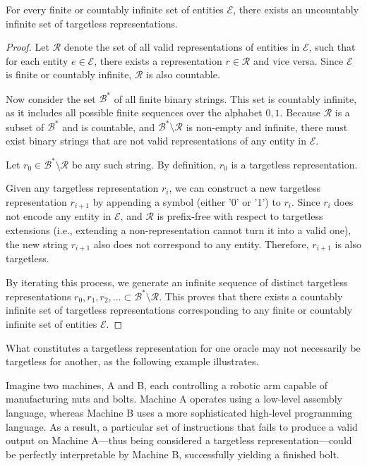 \begin{proposition}
For every finite or countably infinite set of entities $\mathcal{E}$, there exists an uncountably infinite set of targetless representations.
\end{proposition}
\begin{proof}
Let $\mathcal{R}$ denote the set of all valid representations of entities in $\mathcal{E}$, such that for each entity $e \in \mathcal{E}$, there exists a representation $r \in \mathcal{R}$ and vice versa. Since $\mathcal{E}$ is finite or countably infinite, $\mathcal{R}$ is also countable.

Now consider the set $\mathcal{B}^\ast$ of all finite binary strings. This set is countably infinite, as it includes all possible finite sequences over the alphabet ${0,1}$. Because $\mathcal{R}$ is a subset of $\mathcal{B}^\ast$ and is countable, and $\mathcal{B}^\ast \setminus \mathcal{R}$ is non-empty and infinite, there must exist binary strings that are not valid representations of any entity in $\mathcal{E}$.

Let $r_0 \in \mathcal{B}^\ast \setminus \mathcal{R}$ be any such string. By definition, $r_0$ is a targetless representation.

Given any targetless representation $r_i$, we can construct a new targetless representation $r_{i+1}$ by appending a symbol (either '0' or '1') to $r_i$. Since $r_i$ does not encode any entity in $\mathcal{E}$, and $\mathcal{R}$ is prefix-free with respect to targetless extensions (i.e., extending a non-representation cannot turn it into a valid one), the new string $r_{i+1}$ also does not correspond to any entity. Therefore, $r_{i+1}$ is also targetless.

By iterating this process, we generate an infinite sequence of distinct targetless representations ${r_0, r_1, r_2, \ldots} \subset \mathcal{B}^\ast \setminus \mathcal{R}$. This proves that there exists a countably infinite set of targetless representations corresponding to any finite or countably infinite set of entities $\mathcal{E}$.
\end{proof}

What constitutes a targetless representation for one oracle may not necessarily be targetless for another, as the following example illustrates.

\begin{example}
Imagine two machines, A and B, each controlling a robotic arm capable of manufacturing nuts and bolts. Machine A operates using a low-level assembly language, whereas Machine B uses a more sophisticated high-level programming language. As a result, a particular set of instructions that fails to produce a valid output on Machine A—thus being considered a targetless representation—could be perfectly interpretable by Machine B, successfully yielding a finished bolt.
\end{example}


